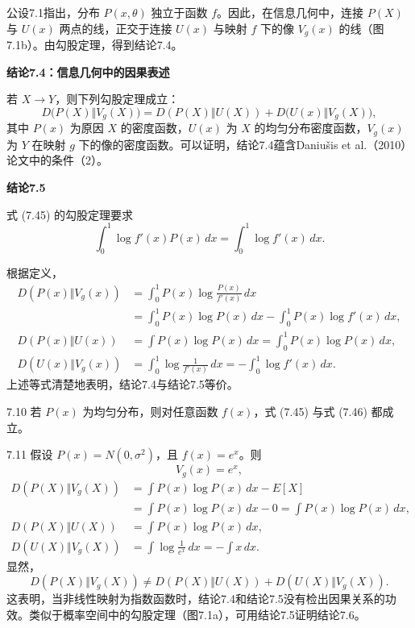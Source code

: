 公设7.1指出，分布 $P(x,\theta)$ 独立于函数 $f$。因此，在信息几何中，连接 $P(X)$ 与 $U(x)$ 两点的线，正交于连接 $U(x)$ 与映射 $f$ 下的像 $V_g(x)$ 的线（图7.1b）。由勾股定理，得到结论7.4。


\par\medskip{}\noindent\textbf{结论7.4：信息几何中的因果表述}\par
若 $X\to Y$，则下列勾股定理成立：
\begin{equation}
D\bigl(P(X)\Vert V_g(X)\bigr)
=D(P(X)\Vert U(X))+D\bigl(U(x)\Vert V_g(X)\bigr),
\tag{7.45}
\end{equation}
其中 $P(x)$ 为原因 $X$ 的密度函数，$U(x)$ 为 $X$ 的均匀分布密度函数，$V_g(x)$ 为 $Y$ 在映射 $g$ 下的像的密度函数。可以证明，结论7.4蕴含Daniušis et al.（2010）论文中的条件（2）。

\par\medskip{}\noindent\textbf{结论7.5}\par
式 (7.45) 的勾股定理要求
\begin{equation}
\int_0^1\log f'(x)P(x)\,dx=\int_0^1\log f'(x)\,dx.
\tag{7.46}
\end{equation}
\begin{bookproof}
根据定义，
\[
\begin{aligned}
D(P(x)\Vert V_g(x))
&=\int_0^1P(x)\log\frac{P(x)}{f'(x)}\,dx\\
&=\int_0^1P(x)\log P(x)\,dx-\int_0^1P(x)\log f'(x)\,dx,\\
D(P(x)\Vert U(x))&=\int P(x)\log P(x)\,dx=\int_0^1P(x)\log P(x)\,dx,\\
D(U(x)\Vert V_g(x))&=\int_0^1\log\frac1{f'(x)}\,dx=-\int_0^1\log f'(x)\,dx.
\end{aligned}
\]
上述等式清楚地表明，结论7.4与结论7.5等价。
\end{bookproof}

\begin{bookexample}{7.10}
若 $P(x)$ 为均匀分布，则对任意函数 $f(x)$，式 (7.45) 与式 (7.46) 都成立。
\end{bookexample}

\begin{bookexample}{7.11}
假设 $P(x)=N(0,\sigma^2)$，且 $f(x)=e^x$。则
\[
V_g(x)=e^x,
\]
\[
\begin{aligned}
D(P(X)\Vert V_g(X))&=\int P(x)\log P(x)\,dx-E[X]\\
&=\int P(x)\log P(x)\,dx-0=\int P(x)\log P(x)\,dx,\\
D(P(X)\Vert U(X))&=\int P(x)\log P(x)\,dx,\\
D(U(X)\Vert V_g(X))&=\int\log\frac1{e^x}\,dx=-\int x\,dx.
\end{aligned}
\]
显然，
\[
D(P(X)\Vert V_g(X))\ne D(P(X)\Vert U(X))+D(U(X)\Vert V_g(X)).
\]
这表明，当非线性映射为指数函数时，结论7.4和结论7.5没有检出因果关系的功效。类似于概率空间中的勾股定理（图7.1a），可用结论7.5证明结论7.6。
\end{bookexample}

